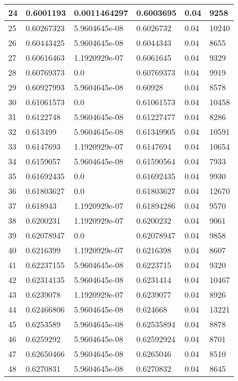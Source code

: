 \begin{longtable}{|l|l|l|l|l|l|}
24 & 0.6001193 & 0.0011464297 & 0.6003695 & 0.04 & 9258 \\ \hline 
25 & 0.60267323 & 5.9604645e-08 & 0.6026732 & 0.04 & 10240 \\ \hline 
26 & 0.60443425 & 5.9604645e-08 & 0.6044343 & 0.04 & 8655 \\ \hline 
27 & 0.60616463 & 1.1920929e-07 & 0.6061645 & 0.04 & 9329 \\ \hline 
28 & 0.60769373 & 0.0 & 0.60769373 & 0.04 & 9919 \\ \hline 
29 & 0.60927993 & 5.9604645e-08 & 0.60928 & 0.04 & 8578 \\ \hline 
30 & 0.61061573 & 0.0 & 0.61061573 & 0.04 & 10458 \\ \hline 
31 & 0.6122748 & 5.9604645e-08 & 0.61227477 & 0.04 & 8286 \\ \hline 
32 & 0.613499 & 5.9604645e-08 & 0.61349905 & 0.04 & 10591 \\ \hline 
33 & 0.6147693 & 1.1920929e-07 & 0.6147694 & 0.04 & 10654 \\ \hline 
34 & 0.6159057 & 5.9604645e-08 & 0.61590564 & 0.04 & 7933 \\ \hline 
35 & 0.61692435 & 0.0 & 0.61692435 & 0.04 & 9930 \\ \hline 
36 & 0.61803627 & 0.0 & 0.61803627 & 0.04 & 12670 \\ \hline 
37 & 0.618943 & 1.1920929e-07 & 0.61894286 & 0.04 & 9570 \\ \hline 
38 & 0.6200231 & 1.1920929e-07 & 0.6200232 & 0.04 & 9061 \\ \hline 
39 & 0.62078947 & 0.0 & 0.62078947 & 0.04 & 9858 \\ \hline 
40 & 0.6216399 & 1.1920929e-07 & 0.6216398 & 0.04 & 8607 \\ \hline 
41 & 0.62237155 & 5.9604645e-08 & 0.6223715 & 0.04 & 9320 \\ \hline 
42 & 0.62314135 & 5.9604645e-08 & 0.6231414 & 0.04 & 10467 \\ \hline 
43 & 0.6239078 & 1.1920929e-07 & 0.6239077 & 0.04 & 8926 \\ \hline 
44 & 0.62466806 & 5.9604645e-08 & 0.624668 & 0.04 & 13221 \\ \hline 
45 & 0.6253589 & 5.9604645e-08 & 0.62535894 & 0.04 & 8878 \\ \hline 
46 & 0.6259292 & 5.9604645e-08 & 0.62592924 & 0.04 & 8701 \\ \hline 
47 & 0.62650466 & 5.9604645e-08 & 0.6265046 & 0.04 & 8510 \\ \hline 
48 & 0.6270831 & 5.9604645e-08 & 0.6270832 & 0.04 & 8645 \\ \hline 

\end{longtable}
